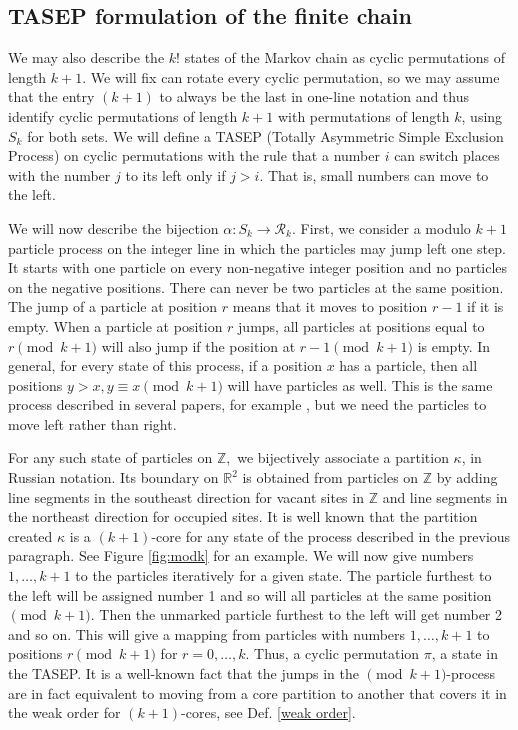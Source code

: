 \documentclass[11pt]{amsart}
\begin{document}
\subsection{TASEP formulation of the finite chain}\label{sec:TASEP}

We may also describe the $k!$ states of the Markov chain as cyclic permutations of length $k+1$. We will fix 
can rotate every cyclic permutation, so we may assume that the entry 
$(k+1)$ to always be the last in one-line notation and thus identify cyclic permutations of length $k+1$ with permutations of length $k$, using $S_k$ for both sets. 
We will define a TASEP (Totally Asymmetric Simple Exclusion Process) on cyclic permutations with the rule that a number $i$ can switch places with the number $j$ to its left only if $j>i$. That is, small numbers can move to the left.

We will now describe the bijection $\alpha :S_k\to \mathcal{R}_k$. First, we consider a modulo $k+1$ particle process on the integer line in which the particles may jump left one step. It starts with one particle on every non-negative integer position and no particles on the negative positions. There can never be two particles at the same position. The jump of a particle at position $r$ means that it moves to position $r-1$ if it is empty. When a particle at position $r$ jumps, all particles at positions equal to $r \pmod{k+1}$ will also jump if the position at $r-1\pmod{k+1}$ is empty. In general, for every state of this process, if a position $x$ has a particle, then all positions $y>x,y\equiv x \pmod{k+1}$ will have particles as well. 
This is the same process described in several papers, for example \cite{AL14,L15}, but we
need the particles to move left rather than right.

For any such state of particles on $\mathbb{Z},$ we bijectively associate a partition $\kappa$, in Russian notation. Its boundary on $\mathbb{R}^2$ is obtained from particles on $\mathbb{Z}$ by adding line segments in the southeast direction for vacant sites in $\mathbb{Z}$ and line segments in the northeast direction for occupied sites. It is well known that the partition created $\kappa$ is a $(k+1)$-core for any state of the process described in the previous paragraph. See Figure \ref{fig:modk} for an example. We will now give numbers $1,\dots,k+1$ to the particles iteratively for a given state. The particle furthest to the left will be assigned number 1 and so will all particles at the same position $\pmod{k+1}$. Then the unmarked particle furthest to the left will get number 2 and so on. This will give a mapping from particles with numbers $1,\dots,k+1$ to positions $r \pmod{k+1}$ for $r=0,\ldots,k$. Thus, a cyclic permutation $\pi$, a state in the TASEP. It is a well-known fact that the jumps in the $\pmod{k+1}$-process are in fact equivalent to moving from a core partition to another that covers it in the weak order for $(k+1)$-cores, see Def. \ref{weak order}.
\end{document}
